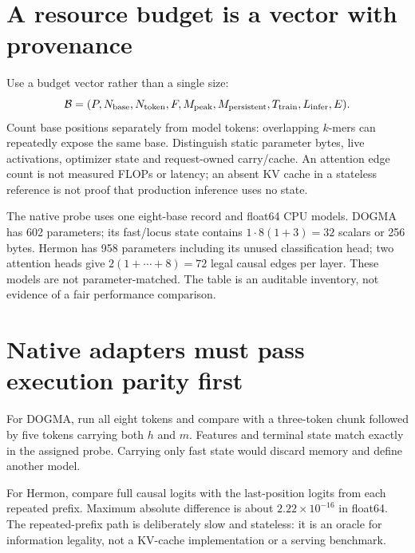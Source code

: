 \section{A resource budget is a vector with provenance}
Use a budget vector rather than a single size:
\[
\mathcal B=(P,N_{\rm base},N_{\rm token},F,M_{\rm peak},M_{\rm persistent},
T_{\rm train},L_{\rm infer},E).
\]
Count base positions separately from model tokens: overlapping $k$-mers
can repeatedly expose the same base. Distinguish static parameter bytes,
live activations, optimizer state and request-owned carry/cache. An attention
edge count is not measured FLOPs or latency; an absent KV cache in a stateless
reference is not proof that production inference uses no state.

\par\medskip\noindent\par\medskip

The native probe uses one eight-base record and float64 CPU models.
DOGMA has 602 parameters; its fast/locus state contains
$1\cdot8(1+3)=32$ scalars or 256 bytes.
Hermon has 958 parameters including its unused classification head;
two attention heads give $2(1+\cdots+8)=72$ legal causal edges per layer.
These models are not parameter-matched. The table is an auditable inventory,
not evidence of a fair performance comparison.

\section{Native adapters must pass execution parity first}
For DOGMA, run all eight tokens and compare with a three-token chunk followed
by five tokens carrying both $h$ and $m$. Features and terminal state match
exactly in the assigned probe. Carrying only fast state would discard memory
and define another model.

For Hermon, compare full causal logits with the last-position logits from
each repeated prefix. Maximum absolute difference is about
$2.22\times10^{-16}$ in float64. The repeated-prefix path is deliberately
slow and stateless: it is an oracle for information legality, not a KV-cache
implementation or a serving benchmark.

